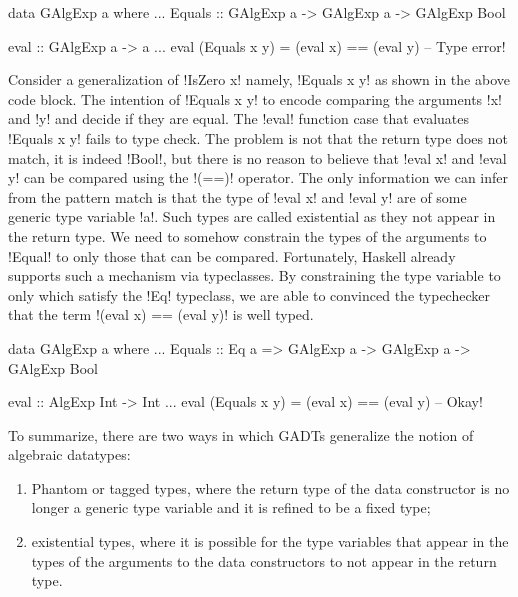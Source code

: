 \documentclass[manuscript,screen,nonacm]{acmart}
\begin{document}
\begin{minipage}[ht]{0.5\linewidth}
\begin{code}
data GAlgExp a where
  ...
  Equals :: GAlgExp a -> GAlgExp a -> GAlgExp Bool
\end{code}
\end{minipage}%
\begin{minipage}[ht]{0.4\linewidth}
\begin{code}
eval :: GAlgExp a -> a
...
eval (Equals x y) = (eval x) == (eval y) -- Type error!
\end{code}
\end{minipage}

Consider a generalization of !IsZero x! namely, !Equals x y! as shown in the above code block. The intention of !Equals x y! to encode comparing the arguments !x! and !y! and decide if they are equal. The !eval! function case that evaluates !Equals x y! fails to type check. The problem is not that the return type does not match, it is indeed !Bool!, but there is no reason to believe that !eval x! and !eval y! can be compared using the !(==)! operator. The only information we can infer from the pattern match is that the type of !eval x! and !eval y! are of some generic type variable !a!. Such types are called existential as they not appear in the return type. We need to somehow constrain the types of the arguments to !Equal! to only those that can be compared. Fortunately, Haskell already supports such a mechanism via typeclasses. By constraining the type variable to only which satisfy the !Eq! typeclass, we are able to convinced the typechecker that the term !(eval x) == (eval y)! is well typed.

\begin{minipage}[ht]{0.5\linewidth}
\begin{code}
data GAlgExp a where
...
   Equals :: Eq a => GAlgExp a -> GAlgExp a
                  -> GAlgExp Bool
\end{code}
\end{minipage}%
\begin{minipage}[ht]{0.4\linewidth}
\begin{code}
eval :: AlgExp Int -> Int
...
eval (Equals x y) = (eval x) == (eval y) -- Okay!
\end{code}
\end{minipage}

To summarize, there are two ways in which GADTs generalize the notion of algebraic datatypes:
\begin{enumerate}
\item Phantom or tagged types, where the return type of the data constructor is no longer a generic type variable and it is refined to be a fixed type;
\item existential types, where it is possible for the type variables that appear in the types of the arguments to the data constructors to not appear in the return type.
\end{enumerate}
\end{document}
